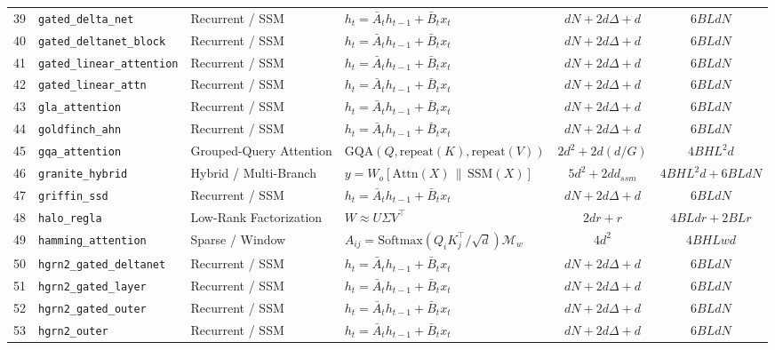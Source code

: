 \begin{center}
\begin{longtable}{rlllcc}
39 & \texttt{gated\_delta\_net} & Recurrent / SSM & $h_t = \bar{A}_t h_{t-1} + \bar{B}_t x_t$ & $d N + 2 d \Delta + d$ & $6 B L d N$ \\
40 & \texttt{gated\_deltanet\_block} & Recurrent / SSM & $h_t = \bar{A}_t h_{t-1} + \bar{B}_t x_t$ & $d N + 2 d \Delta + d$ & $6 B L d N$ \\
41 & \texttt{gated\_linear\_attention} & Recurrent / SSM & $h_t = \bar{A}_t h_{t-1} + \bar{B}_t x_t$ & $d N + 2 d \Delta + d$ & $6 B L d N$ \\
42 & \texttt{gated\_linear\_attn} & Recurrent / SSM & $h_t = \bar{A}_t h_{t-1} + \bar{B}_t x_t$ & $d N + 2 d \Delta + d$ & $6 B L d N$ \\
43 & \texttt{gla\_attention} & Recurrent / SSM & $h_t = \bar{A}_t h_{t-1} + \bar{B}_t x_t$ & $d N + 2 d \Delta + d$ & $6 B L d N$ \\
44 & \texttt{goldfinch\_ahn} & Recurrent / SSM & $h_t = \bar{A}_t h_{t-1} + \bar{B}_t x_t$ & $d N + 2 d \Delta + d$ & $6 B L d N$ \\
45 & \texttt{gqa\_attention} & Grouped-Query Attention & $\text{GQA}(Q, \text{repeat}(K), \text{repeat}(V))$ & $2 d^2 + 2 d (d / G)$ & $4 B H L^2 d$ \\
46 & \texttt{granite\_hybrid} & Hybrid / Multi-Branch & $y = W_o [\text{Attn}(X) \,\|\, \text{SSM}(X)]$ & $5 d^2 + 2 d d_{ssm}$ & $4 B H L^2 d + 6 B L d N$ \\
47 & \texttt{griffin\_ssd} & Recurrent / SSM & $h_t = \bar{A}_t h_{t-1} + \bar{B}_t x_t$ & $d N + 2 d \Delta + d$ & $6 B L d N$ \\
48 & \texttt{halo\_regla} & Low-Rank Factorization & $W \approx U \Sigma V^\top$ & $2 d r + r$ & $4 B L d r + 2 B L r$ \\
49 & \texttt{hamming\_attention} & Sparse / Window & $A_{ij} = \text{Softmax}(Q_i K_j^\top / \sqrt{d}) \mathcal{M}_w$ & $4 d^2$ & $4 B H L w d$ \\
50 & \texttt{hgrn2\_gated\_deltanet} & Recurrent / SSM & $h_t = \bar{A}_t h_{t-1} + \bar{B}_t x_t$ & $d N + 2 d \Delta + d$ & $6 B L d N$ \\
51 & \texttt{hgrn2\_gated\_layer} & Recurrent / SSM & $h_t = \bar{A}_t h_{t-1} + \bar{B}_t x_t$ & $d N + 2 d \Delta + d$ & $6 B L d N$ \\
52 & \texttt{hgrn2\_gated\_outer} & Recurrent / SSM & $h_t = \bar{A}_t h_{t-1} + \bar{B}_t x_t$ & $d N + 2 d \Delta + d$ & $6 B L d N$ \\
53 & \texttt{hgrn2\_outer} & Recurrent / SSM & $h_t = \bar{A}_t h_{t-1} + \bar{B}_t x_t$ & $d N + 2 d \Delta + d$ & $6 B L d N$ \\

\end{longtable}
\end{center}
